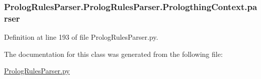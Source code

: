 \subsubsection[{parser}]{\setlength{\rightskip}{0pt plus 5cm}Prolog\+Rules\+Parser.\+Prolog\+Rules\+Parser.\+Prologthing\+Context.\+parser}\label{class_prolog_rules_parser_1_1_prolog_rules_parser_1_1_prologthing_context_acb9ba47ada7ed08b01eefa6d4142eee7}


Definition at line 193 of file Prolog\+Rules\+Parser.\+py.



The documentation for this class was generated from the following file\+:\begin{DoxyCompactItemize}
\item 
\hyperlink{_prolog_rules_parser_8py}{Prolog\+Rules\+Parser.\+py}\end{DoxyCompactItemize}
